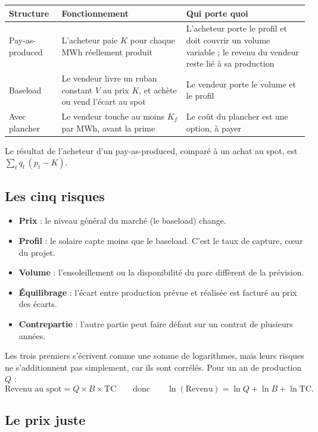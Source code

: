 \documentclass[11pt,a4paper]{article}
\newcommand{\TC}{\mathrm{TC}}
\begin{document}
\begin{center}
\begin{tabularx}{\linewidth}{lYY}
\toprule
\textbf{Structure} & \textbf{Fonctionnement} & \textbf{Qui porte quoi} \\
\midrule
Pay-as-produced & L'acheteur paie $K$ pour chaque MWh réellement produit & L'acheteur porte le profil et doit couvrir un volume variable ; le revenu du vendeur reste lié à sa production \\
Baseload & Le vendeur livre un ruban constant $V$ au prix $K$, et achète ou vend l'écart au spot & Le vendeur porte le volume et le profil \\
Avec plancher & Le vendeur touche au moins $K_f$ par MWh, avant la prime & Le coût du plancher est une option, à payer \\
\bottomrule
\end{tabularx}
\end{center}

Le résultat de l'acheteur d'un pay-as-produced, comparé à un achat au spot, est $\sum_t q_t\,(p_t - K)$.

\subsection{Les cinq risques}

\begin{itemize}
\item \textbf{Prix} : le niveau général du marché (le baseload) change.
\item \textbf{Profil} : le solaire capte moins que le baseload. C'est le taux de capture, cœur du projet.
\item \textbf{Volume} : l'ensoleillement ou la disponibilité du parc diffèrent de la prévision.
\item \textbf{Équilibrage} : l'écart entre production prévue et réalisée est facturé au prix des écarts.
\item \textbf{Contrepartie} : l'autre partie peut faire défaut sur un contrat de plusieurs années.
\end{itemize}

Les trois premiers s'écrivent comme une somme de logarithmes, mais leurs risques ne s'additionnent pas simplement, car ils sont corrélés. Pour un an de production $Q$ :
\[
\text{Revenu au spot} = Q \times B \times \TC
\qquad\text{donc}\qquad
\ln(\text{Revenu}) = \ln Q + \ln B + \ln \TC .
\]

\subsection{Le prix juste}
\end{document}
